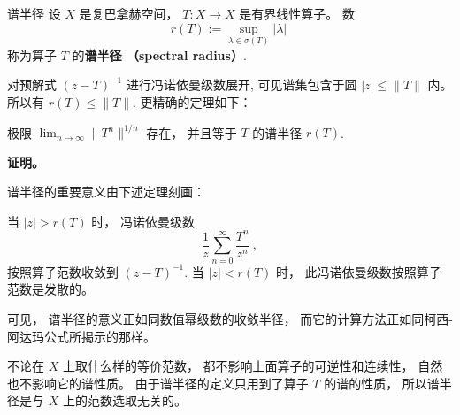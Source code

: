 
\begin{definition}{谱半径}
设 $X$ 是复巴拿赫空间， $T:X\to X$ 是有界线性算子。 数
$$
r(T):=\sup_{\lambda\in\sigma(T)}|\lambda|~
$$
称为算子 $T$ 的\textbf{谱半径 （spectral radius）}.
\end{definition}

对预解式 $(z-T)^{-1}$ 进行冯诺依曼级数展开, 可见谱集包含于圆 $|z|\leq\|T\|$ 内。 所以有 $r(T)\leq\|T\|$. 更精确的定理如下：
\begin{theorem}{}
极限 $\lim_{n\to\infty}\|T^n\|^{1/n}$ 存在， 并且等于 $T$ 的谱半径 $r(T)$. 
\end{theorem}
\textbf{证明。} 

谱半径的重要意义由下述定理刻画：
\begin{theorem}{}
当 $|z|>r(T)$ 时， 冯诺依曼级数
$$
\frac{1}{z}\sum_{n=0}^\infty\frac{T^n}{z^n}~,
$$ 
按照算子范数收敛到 $(z-T)^{-1}$. 当 $|z|<r(T)$ 时， 此冯诺依曼级数按照算子范数是发散的。
\end{theorem}

可见， 谱半径的意义正如同数值幂级数的收敛半径， 而它的计算方法正如同柯西-阿达玛公式所揭示的那样。

不论在 $X$ 上取什么样的等价范数， 都不影响上面算子的可逆性和连续性， 自然也不影响它的谱性质。 由于谱半径的定义只用到了算子 $T$ 的谱的性质， 所以谱半径是与 $X$ 上的范数选取无关的。 
